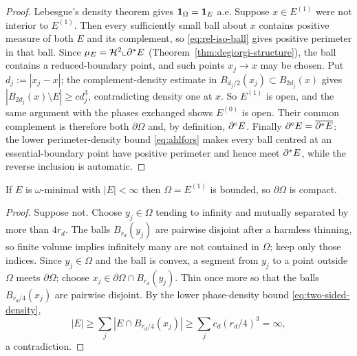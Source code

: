 \begin{proof}
Lebesgue's density theorem gives $\mathbf 1_{\Omega}=\mathbf 1_{E}$ a.e.  Suppose
$x\in E^{(1)}$ were not interior to $E^{(1)}$.  Then every sufficiently small
ball about $x$ contains positive measure of both $E$ and its complement, so
\eqref{eq:rel-iso-ball} gives positive perimeter in that ball.  Since
$\mu_E=\mathcal H^2\llcorner\partial^* E$ (Theorem~\ref{thm:degiorgi-structure}), the ball
contains a reduced-boundary point, and such points $x_j\to x$ may be chosen.
Put $d_j:=|x_j-x|$; the complement-density estimate in
$B_{d_j/2}(x_j)\subset B_{2d_j}(x)$ gives
$|B_{2d_j}(x)\setminus E|\ge cd_j^3$, contradicting density one at $x$.  So
$E^{(1)}$ is open, and the same argument with the phases exchanged shows
$E^{(0)}$ is open.  Their common complement is therefore both
$\partial\Omega$ and, by definition, $\partial^{\mathrm e} E$.  Finally
$\partial^{\mathrm e} E=\overline{\partial^* E}$: the lower perimeter-density bound
\eqref{eq:ahlfors} makes every ball centred at an essential-boundary point
have positive perimeter and hence meet $\partial^* E$, while the reverse inclusion
is automatic.
\end{proof}

\begin{lemma}[Boundedness]\label{lem:bounded-representative}
If $E$ is $\omega$-minimal with $|E|<\infty$ then $\Omega=E^{(1)}$ is bounded,
so $\partial\Omega$ is compact.
\end{lemma}

\begin{proof}
Suppose not.  Choose $y_j\in\Omega$ tending to infinity and mutually separated
by more than $4r_d$.  The balls $B_{r_d}(y_j)$ are pairwise disjoint after a
harmless thinning, so finite volume implies infinitely many are not contained
in $\Omega$; keep only those indices.  Since $y_j\in\Omega$ and the ball is
convex, a segment from $y_j$ to a point outside $\Omega$ meets
$\partial\Omega$; choose $x_j\in\partial\Omega\cap B_{r_d}(y_j)$.  Thin once
more so that the balls $B_{r_d/4}(x_j)$ are pairwise disjoint.  By
the lower phase-density bound \eqref{eq:two-sided-density},
\[
  |E|\ge\sum_j|E\cap B_{r_d/4}(x_j)|
  \ge\sum_jc_d(r_d/4)^3=\infty,
\]
a contradiction.
\end{proof}

